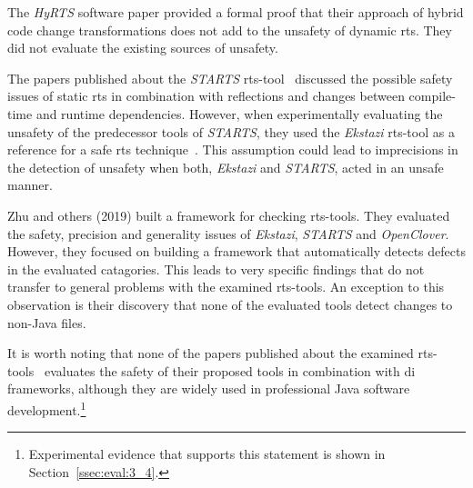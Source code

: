 The \emph{HyRTS} software paper provided a formal proof that their approach of hybrid code change
transformations does not add to the unsafety of dynamic \ac{rts}. They did not evaluate the existing
sources of unsafety.\cite{hyrts_paper}

The papers published about the \emph{STARTS} \ac{rts}-tool~\cite{prestarts,starts_paper} discussed the possible safety issues of static
\ac{rts} in combination with reflections and changes between compile-time and runtime dependencies.
However, when experimentally evaluating the unsafety of the predecessor tools of \emph{STARTS}, they used the
\emph{Ekstazi} \ac{rts}-tool as a reference for a safe \ac{rts} technique~\cite{prestarts}. This assumption
could lead to imprecisions in the detection of unsafety when both, \emph{Ekstazi} and \emph{STARTS}, acted in an
unsafe manner.

Zhu and others (2019) built a framework for checking \ac{rts}-tools. They evaluated the safety,
precision and generality issues of \emph{Ekstazi}, \emph{STARTS} and \emph{OpenClover}. However, they focused on building
a framework that automatically detects defects in the evaluated catagories. This leads to very specific findings that do
not transfer to general problems with the examined \ac{rts}-tools. An exception to this observation
is their discovery that none of the evaluated tools detect changes to non-Java files.\cite{unsafety_eval}

It is worth noting that none of the papers published about the examined \ac{rts}-
tools~\cite{ekstazimain,ekstazispec,prestarts,starts_paper,hyrts_paper,gibstazi_paper} evaluates the
safety of their proposed tools in combination with \ac{di} frameworks, although they are widely used
in professional Java software development.\footnote{Experimental evidence that supports this statement is
shown in Section~\ref{ssec:eval:3_4}.}
